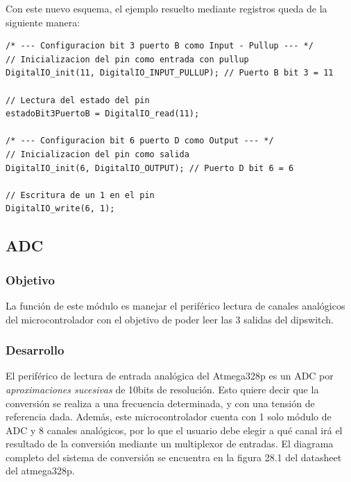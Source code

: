 Con este nuevo esquema, el ejemplo resuelto mediante registros queda de la siguiente manera:
\begin{lstlisting}[style=CStyle]
/* --- Configuracion bit 3 puerto B como Input - Pullup --- */
// Inicializacion del pin como entrada con pullup
DigitalIO_init(11, DigitalIO_INPUT_PULLUP); // Puerto B bit 3 = 11

// Lectura del estado del pin
estadoBit3PuertoB = DigitalIO_read(11);

/* --- Configuracion bit 6 puerto D como Output --- */
// Inicializacion del pin como salida
DigitalIO_init(6, DigitalIO_OUTPUT); // Puerto D bit 6 = 6

// Escritura de un 1 en el pin
DigitalIO_write(6, 1);

\end{lstlisting}


\subsection{ADC}
\subsubsection{Objetivo}
La función de este módulo es manejar el periférico lectura de canales analógicos del microcontrolador con el objetivo de poder leer las 3 salidas del dipswitch.

\subsubsection{Desarrollo}
El periférico de lectura de entrada analógica del Atmega328p es un ADC por \textit{aproximaciones sucesivas} de 10bits de resolución. Esto quiere decir que la conversión se realiza a una frecuencia determinada, y con una tensión de referencia dada. Además, este microcontrolador cuenta con 1 solo módulo de ADC y 8 canales analógicos, por lo que el usuario debe elegir a qué canal irá el resultado de la conversión mediante un multiplexor de entradas. El diagrama completo del sistema de conversión se encuentra en la figura 28.1 del datasheet del atmega328p.


